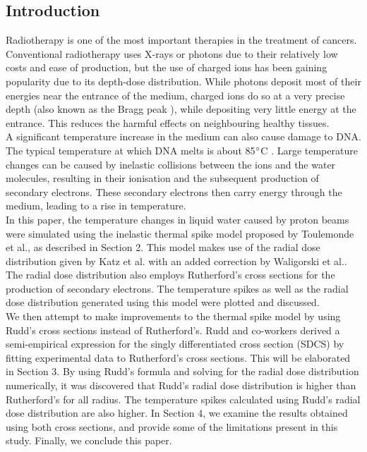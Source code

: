 \documentclass{article}
\begin{document}
\begin{multicols}{2}
\section{Introduction}

\indent Radiotherapy is one of the most important therapies in the treatment of cancers. Conventional radiotherapy uses X-rays or photons due to their relatively low costs and ease of production, but the use of charged ions has been gaining popularity due to its depth-dose distribution. While photons deposit most of their energies near the entrance of the medium, charged ions do so at a very precise depth (also known as the Bragg peak \cite{proton}), while depositing very little energy at the entrance. This reduces the harmful effects on neighbouring healthy tissues. \\
\indent A significant temperature increase in the medium can also cause damage to DNA. The typical temperature at which DNA melts is about 85$\degree$C \cite{localheating}. Large temperature changes can be caused by inelastic collisions between the ions and the water molecules, resulting in their ionisation and the subsequent production of secondary electrons. These secondary electrons then carry energy through the medium, leading to a rise in temperature.\\
\indent In this paper, the temperature changes in liquid water caused by proton beams were simulated using the inelastic thermal spike model proposed by Toulemonde et al.\cite{thermalspike}, as described in Section 2. This model makes use of the radial dose distribution given by Katz et al.\cite{katz} with an added correction by Waligorski et al.\cite{waligorski}. The radial dose distribution also employs Rutherford's cross sections for the production of secondary electrons. The temperature spikes as well as the radial dose distribution generated using this model were plotted and discussed. \\
\indent We then attempt to make improvements to the thermal spike model by using Rudd's cross sections instead of Rutherford's. Rudd and co-workers \cite{rudd} derived a semi-empirical expression for the singly differentiated cross section (SDCS) by fitting experimental data to Rutherford's cross sections. This will be elaborated in Section 3. By using Rudd's formula and solving for the radial dose distribution numerically, it was discovered that Rudd's radial dose distribution is higher than Rutherford's for all radius. The temperature spikes calculated using Rudd's radial dose distribution are also higher. 
\indent In Section 4, we examine the results obtained using both cross sections, and provide some of the limitations present in this study. Finally, we conclude this paper.
 

\end{multicols}
\end{document}

